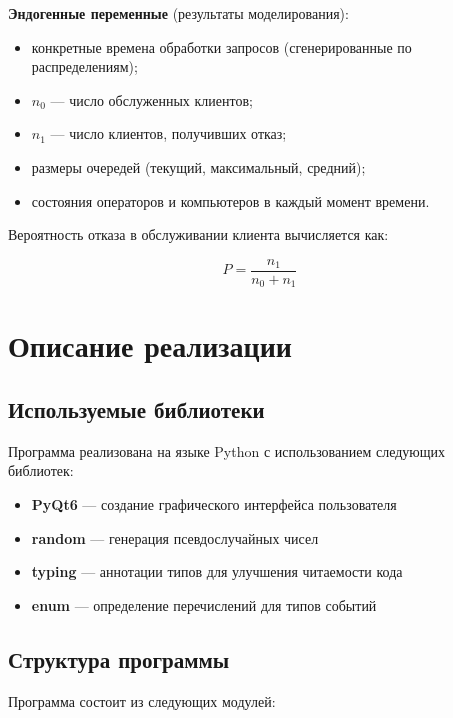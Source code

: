 \textbf{Эндогенные переменные} (результаты моделирования):

\begin{itemize}
    \item конкретные времена обработки запросов (сгенерированные по распределениям);
    \item $n_0$ — число обслуженных клиентов;
    \item $n_1$ — число клиентов, получивших отказ;
    \item размеры очередей (текущий, максимальный, средний);
    \item состояния операторов и компьютеров в каждый момент времени.
\end{itemize}

Вероятность отказа в обслуживании клиента вычисляется как:

\begin{equation}
P = \frac{n_1}{n_0 + n_1}
\end{equation}

\section{Описание реализации}

\subsection{Используемые библиотеки}

Программа реализована на языке Python с использованием следующих библиотек:

\begin{itemize}
    \item \textbf{PyQt6} — создание графического интерфейса пользователя
    \item \textbf{random} — генерация псевдослучайных чисел
    \item \textbf{typing} — аннотации типов для улучшения читаемости кода
    \item \textbf{enum} — определение перечислений для типов событий
\end{itemize}

\subsection{Структура программы}

Программа состоит из следующих модулей:


